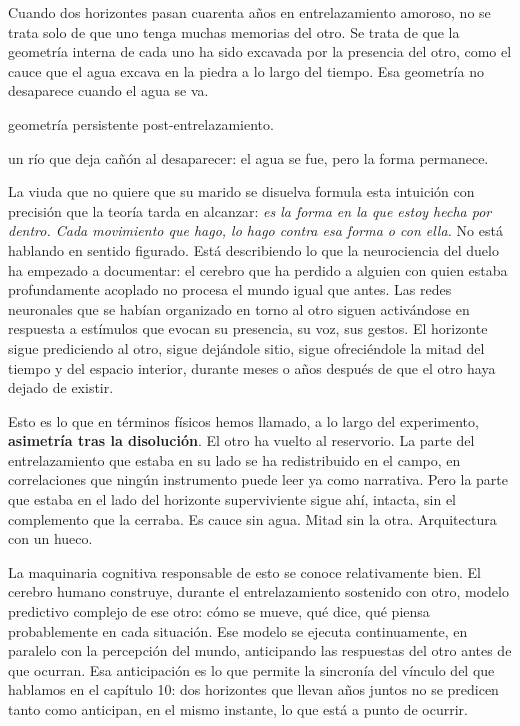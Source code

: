 \noindent Cuando dos horizontes pasan cuarenta años en entrelazamiento amoroso, no se trata solo de que uno tenga muchas memorias del otro. Se trata de que la geometría interna de cada uno ha sido excavada por la presencia del otro, como el cauce que el agua excava en la piedra a lo largo del tiempo. Esa geometría no desaparece cuando el agua se va.

\begin{fisica}
 geometría persistente post-entrelazamiento.

 un río que deja cañón al desaparecer: el agua se fue, pero la forma permanece.
\end{fisica}
La viuda que no quiere que su marido se disuelva formula esta intuición con precisión que la teoría tarda en alcanzar: \emph{es la forma en la que estoy hecha por dentro. Cada movimiento que hago, lo hago contra esa forma o con ella.} No está hablando en sentido figurado. Está describiendo lo que la neurociencia del duelo ha empezado a documentar: el cerebro que ha perdido a alguien con quien estaba profundamente acoplado no procesa el mundo igual que antes. Las redes neuronales que se habían organizado en torno al otro siguen activándose en respuesta a estímulos que evocan su presencia, su voz, sus gestos. El horizonte sigue prediciendo al otro, sigue dejándole sitio, sigue ofreciéndole la mitad del tiempo y del espacio interior, durante meses o años después de que el otro haya dejado de existir.

Esto es lo que en términos físicos hemos llamado, a lo largo del experimento, \textbf{asimetría tras la disolución}. El otro ha vuelto al reservorio. La parte del entrelazamiento que estaba en su lado se ha redistribuido en el campo, en correlaciones que ningún instrumento puede leer ya como narrativa. Pero la parte que estaba en el lado del horizonte superviviente sigue ahí, intacta, sin el complemento que la cerraba. Es cauce sin agua. Mitad sin la otra. Arquitectura con un hueco.

\noindent La maquinaria cognitiva responsable de esto se conoce relativamente bien. El cerebro humano construye, durante el entrelazamiento sostenido con otro, modelo predictivo complejo de ese otro: cómo se mueve, qué dice, qué piensa probablemente en cada situación. Ese modelo se ejecuta continuamente, en paralelo con la percepción del mundo, anticipando las respuestas del otro antes de que ocurran. Esa anticipación es lo que permite la sincronía del vínculo del que hablamos en el capítulo 10: dos horizontes que llevan años juntos no se predicen tanto como anticipan, en el mismo instante, lo que está a punto de ocurrir.

